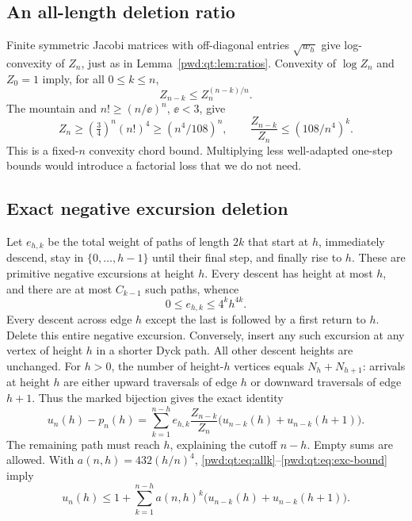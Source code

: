\documentclass[11pt,letterpaper]{article}
\numberwithin{equation}{section}
\theoremstyle{remark}\newtheorem{remark}[theorem]{Remark}
\begin{document}
\subsection{An all-length deletion ratio}
Finite symmetric Jacobi matrices with off-diagonal entries $\sqrt{w_h}$ give log-convexity of $Z_n$, just as in Lemma~\ref{pwd:qt:lem:ratios}. Convexity of $\log Z_n$ and $Z_0=1$ imply, for all $0\le k\le n$,
\[
 Z_{n-k}\le Z_n^{(n-k)/n}.
\]
The mountain and $n!\ge(n/\ee)^n$, $\ee<3$, give
\begin{equation}\label{pwd:qt:eq:allk}
 Z_n\ge(\tfrac34)^n(n!)^4\ge(n^4/108)^n,
 \qquad \frac{Z_{n-k}}{Z_n}\le(108/n^4)^k.
\end{equation}
This is a fixed-$n$ convexity chord bound. Multiplying less well-adapted one-step bounds would introduce a factorial loss that we do not need.

\subsection{Exact negative excursion deletion}
Let $e_{h,k}$ be the total weight of paths of length $2k$ that start at $h$, immediately descend, stay in $\{0,\ldots,h-1\}$ until their final step, and finally rise to $h$. These are primitive negative excursions at height $h$. Every descent has height at most $h$, and there are at most $C_{k-1}$ such paths, whence
\begin{equation}\label{pwd:qt:eq:exc-bound}
 0\le e_{h,k}\le4^kh^{4k}.
\end{equation}
Every descent across edge $h$ except the last is followed by a first return to $h$. Delete this entire negative excursion. Conversely, insert any such excursion at any vertex of height $h$ in a shorter Dyck path. All other descent heights are unchanged. For $h>0$, the number of height-$h$ vertices equals $N_h+N_{h+1}$: arrivals at height $h$ are either upward traversals of edge $h$ or downward traversals of edge $h+1$. Thus the marked bijection gives the exact identity
\begin{equation}\label{pwd:qt:eq:exc-identity}
 u_n(h)-p_n(h)=\sum_{k=1}^{n-h}e_{h,k}\frac{Z_{n-k}}{Z_n}
             \bigl(u_{n-k}(h)+u_{n-k}(h+1)\bigr).
\end{equation}
The remaining path must reach $h$, explaining the cutoff $n-h$. Empty sums are allowed. With $a(n,h)=432(h/n)^4$, \eqref{pwd:qt:eq:allk}--\eqref{pwd:qt:eq:exc-bound} imply
\begin{equation}\label{pwd:qt:eq:recursion}
 u_n(h)\le1+\sum_{k=1}^{n-h}a(n,h)^k
                   \bigl(u_{n-k}(h)+u_{n-k}(h+1)\bigr).
\end{equation}
\end{document}
